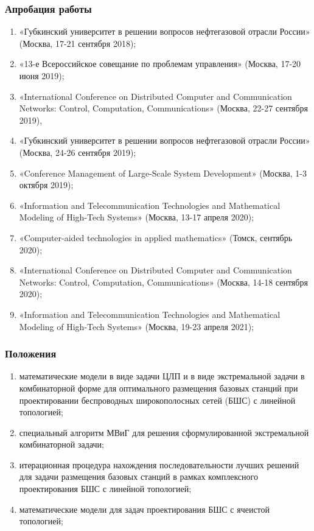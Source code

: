 \begin{frame}
    \frametitle{Апробация работы}
    \begin{enumerate} %
        \fontsize{8pt}{7.2}\selectfont
        \item «Губкинский университет в решении вопросов нефтегазовой отрасли России» (Москва, 17-21 сентября 2018); 
        \item «13-е Всероссийское совещание по проблемам управления» (Москва, 17-20 июня 2019); 
        \item «International Conference on Distributed Computer and Communication Networks: Control, Computation, Communications» (Москва, 22-27 сентября 2019), 
        \item «Губкинский университет в решении вопросов нефтегазовой отрасли России» (Москва, 24-26 сентября 2019); 
        \item «Conference Management of Large-Scale System Development» (Москва, 1-3 октября 2019); 
        \item «Information and Telecommunication Technologies and Mathematical Modeling of High-Tech Systems» (Москва, 13-17 апреля 2020); 
        \item «Computer-aided technologies in applied mathematics» (Томск, сентябрь 2020);
        \item «International Conference on Distributed Computer and Communication Networks: Control, Computation, Communications» (Москва, 14-18 сентября 2020); 
        \item «Information and Telecommunication Technologies and Mathematical Modeling of High-Tech Systems» (Москва, 19-23 апреля 2021);
      \end{enumerate}
\end{frame}

\begin{frame}
    \frametitle{Положения}
    \begin{enumerate} %
        \item математические модели в виде задачи ЦЛП и в виде экстремальной задачи в комбинаторной форме для оптимального размещения базовых станций при
        проектировании беспроводных широкополосных сетей (БШС) с линейной топологией;
        \item специальный алгоритм МВиГ для решения сформулированной экстремальной комбинаторной задачи;
        \item итерационная процедура нахождения последовательности лучших решений для задачи размещения базовых станций в рамках комплексного
        проектирования БШС с линейной топологией;
        \item математические модели для задач  проектирования БШС с ячеистой
        топологией;
      \end{enumerate}
\end{frame}

